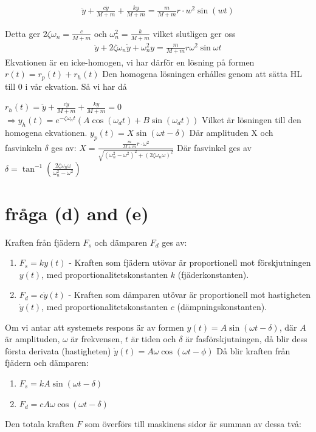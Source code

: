 \documentclass{assignment}
\begin{document}
\begin{align}
\ddot{y}+\frac{c \dot{y}}{M+m}+\frac{k y}{M+m}=\frac{m}{M+m} r \cdot w^2 \sin (wt)
\end{align}

Detta ger $2\zeta \omega_n=\frac{c}{M+m}$ och $\omega_n^2=\frac{k}{M+m}$
vilket slutligen ger oss 
\begin{align}
    \ddot{y}+2 \zeta \omega_n \dot{y}+\omega_n^2 y=\frac{m}{M+m} r\omega^2 \sin \omega t
\end{align}
Ekvationen är en icke-homogen, vi har därför en lösning på formen 
$r(t)=r_p(t)+r_h(t)$
Den homogena lösningen erhålles genom att sätta HL till $0$ i vår ekvation. Så vi har då

$r_h(t)=\ddot{y}+\frac{c \dot{y}}{M+m}+\frac{k y}{M+m}=0$
$\Longrightarrow y_h(t)=e^{-\zeta \omega_n t}\left(A \cos \left(\omega_d t\right)+B \sin \left(\omega_d t\right)\right)$
Vilket är lösningen till den homogena ekvationen. 
$y_p(t)=X \sin (\omega t-\delta)$
Där amplituden $\mathrm{X} $ och fasvinkeln  $\delta$ ges av:
$X=\frac{\frac{m}{M+m} r \cdot \omega^2}{\sqrt{\left(\omega_n^2-\omega^2\right)^2+\left(2 \zeta \omega_n \omega\right)^2}}$
Där fasvinkel ges av
$\delta=\tan ^{-1}\left(\frac{2 \zeta \omega_n \omega}{\omega_n^2-\omega^2}\right)$


\section{fråga (d) and (e)}

Kraften från fjädern $F_s$ och dämparen $F_d$ ges av:
\begin{enumerate}
    \item $F_s = k y(t)$ - Kraften som fjädern utövar är proportionell mot förskjutningen $y(t)$, med proportionalitetskonstanten $k$ (fjäderkonstanten).
    \item $F_d = c \dot{y}(t)$ - Kraften som dämparen utövar är proportionell mot hastigheten $\dot{y}(t)$, med proportionalitetskonstanten $c$ (dämpningskonstanten).
\end{enumerate}

Om vi antar att systemets respons är av formen $y(t)=A \sin (\omega t-\delta)$, 
där $A$ är amplituden, $\omega$ är frekvensen, 
$t$ är tiden och $\delta$ är fasförskjutningen, 
då blir dess första derivata (hastigheten) $\dot{y}(t)=A \omega \cos (\omega t-\phi)$
Då blir kraften från fjädern och dämparen:
\begin{enumerate}
    \item $F_s=k A \sin (\omega t-\delta)$
    \item $F_d=c A \omega \cos (\omega t-\delta)$
\end{enumerate}
Den totala kraften $F$ som överförs till maskinens sidor är summan av dessa två:
\end{document}
